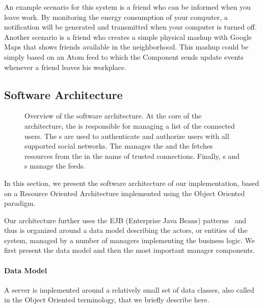 An example scenario for this system is a friend who can be informed when you leave work. By monitoring the energy consumption of your computer, a notification will be generated and transmitted when your computer is turned off. Another scenario is a friend who creates a simple physical mashup with Google Maps that shows friends available in the neighborhood. This mashup could be simply based on an Atom feed to which the  Component sends update events whenever a friend leaves his workplace.




\subsection{Software Architecture}\label{sac-architecture}
\begin{figure}
\caption{Overview of the \sac{} software architecture. At the core of the architecture, the  is responsible for managing a list of the connected users. The s are used to authenticate and authorize users with all supported social networks. The  manages the \sgs{} and the  fetches resources from the \sgs{} in the name of trusted connections. Finally, s and s manage the feeds.}
\label{fig:sac-archi}
\end{figure}
In this section, we present the software architecture of our \sac{} implementation, based on a Resource Oriented Architecture implemented using the Object Oriented paradigm. 

Our architecture further uses the EJB (Enterprise Java Beans) patterns~\cite{Monson-Haefel2006} and thus is organized around a data model describing the actors, or entities of the system, managed by a number of managers implementing the business logic. We first present the data model and then the most important manager components.

\paragraph{Data Model}
A \sac{} server is implemented around a relatively small set of data classes, also called  in the Object Oriented terminology, that we briefly describe here. 

